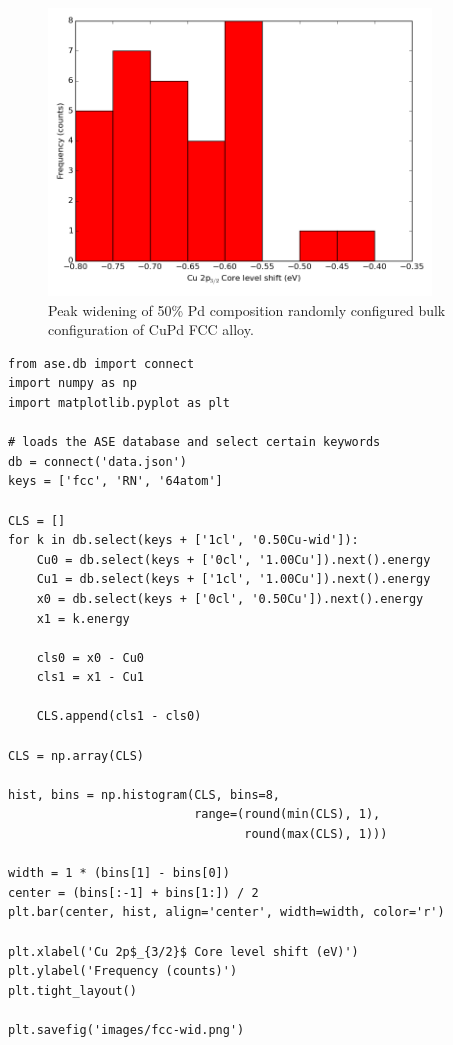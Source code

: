 \documentclass[number, sort&compress, review, 12pt]{elsarticle}
\begin{document}
\begin{figure}[H]
\centering
\includegraphics[width=4in]{./images/fcc-wid.png}
\caption{\label{fig-fccwid}Peak widening of 50\% Pd composition randomly configured bulk configuration of CuPd FCC alloy.}
\end{figure}
\begin{verbatim}
from ase.db import connect
import numpy as np
import matplotlib.pyplot as plt

# loads the ASE database and select certain keywords
db = connect('data.json')
keys = ['fcc', 'RN', '64atom']

CLS = []
for k in db.select(keys + ['1cl', '0.50Cu-wid']):
    Cu0 = db.select(keys + ['0cl', '1.00Cu']).next().energy
    Cu1 = db.select(keys + ['1cl', '1.00Cu']).next().energy
    x0 = db.select(keys + ['0cl', '0.50Cu']).next().energy
    x1 = k.energy

    cls0 = x0 - Cu0
    cls1 = x1 - Cu1

    CLS.append(cls1 - cls0)

CLS = np.array(CLS)

hist, bins = np.histogram(CLS, bins=8,
                          range=(round(min(CLS), 1),
                                 round(max(CLS), 1)))

width = 1 * (bins[1] - bins[0])
center = (bins[:-1] + bins[1:]) / 2
plt.bar(center, hist, align='center', width=width, color='r')

plt.xlabel('Cu 2p$_{3/2}$ Core level shift (eV)')
plt.ylabel('Frequency (counts)')
plt.tight_layout()

plt.savefig('images/fcc-wid.png')
\end{verbatim}
\end{document}
